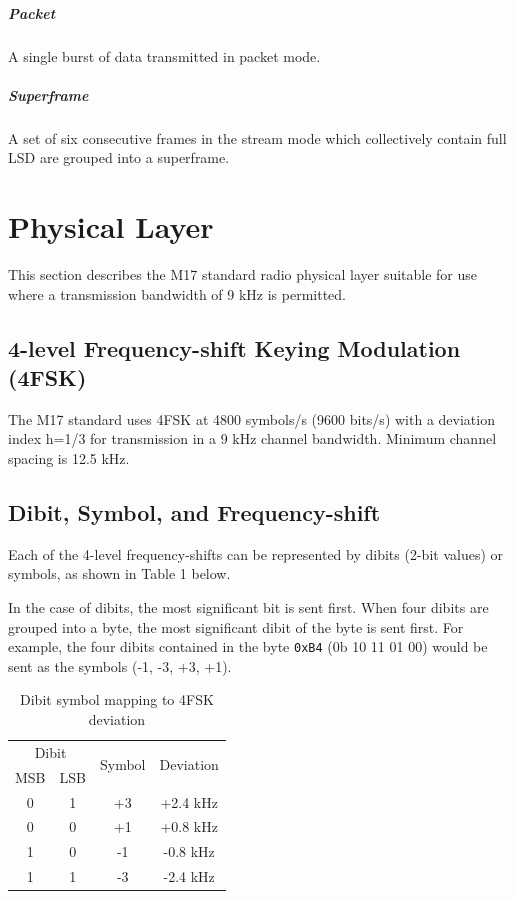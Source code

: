 \documentclass[a4paper,11pt,oneside]{book}
\makeatletter
\renewcommand{\mainmatter}{\cleardoublepage\@mainmattertrue}
\makeatother
\begin{document}
\paragraph{Packet}

A single burst of data transmitted in packet mode.

\paragraph{Superframe}

A set of six consecutive frames in the stream mode which collectively contain full LSD are grouped into a superframe.

\mainmatter
\chapter{Physical Layer}

This section describes the M17 standard radio physical layer suitable
for use where a transmission bandwidth of 9 kHz is permitted.

\section{4-level Frequency-shift Keying Modulation (4FSK)}

The M17 standard uses 4FSK at 4800 symbols/s (9600 bits/s) with a deviation index h=1/3 for transmission in a 9 kHz channel bandwidth. Minimum channel spacing is 12.5 kHz.

\section{Dibit, Symbol, and Frequency-shift}

Each of the 4-level frequency-shifts can be represented by dibits (2-bit values) or symbols, as shown in Table 1 below.

In the case of dibits, the most significant bit is sent first. When four dibits are grouped into a byte, the most significant dibit of the byte
is sent first. For example, the four dibits contained in the byte \texttt{0xB4} (0b 10 11 01 00) would be sent as the symbols (-1, -3, +3, +1).

\begin{table}[H]
	\centering
	\begin{tabular}{|c|c|c|c|}
		\hline
		\multicolumn{2}{|c|}{Dibit} & \multirow{2}{*}{Symbol} & \multirow{2}{*}{Deviation} \\
		MSB & LSB &  &  \\
		\hline
		0 & 1 & +3 & +2.4 kHz \\
		0 & 0 & +1 & +0.8 kHz \\
		1 & 0 & -1 & -0.8 kHz \\
		1 & 1 & -3 & -2.4 kHz \\
		\hline
	\end{tabular}
	\caption{Dibit symbol mapping to 4FSK deviation}
\end{table}
\end{document}
